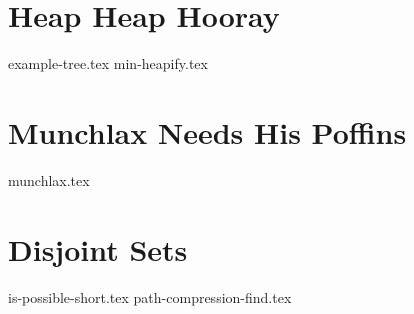 \documentclass[11pt]{exam}
\begin{document}
\section{Heap Heap Hooray}

\begin{questions}
{example-tree.tex}
{min-heapify.tex}
\end{questions}

\clearpage


\section{Munchlax Needs His Poffins}

\begin{questions}
{munchlax.tex}
\end{questions}

\clearpage


\section{Disjoint Sets}

\begin{questions}
{is-possible-short.tex}
{path-compression-find.tex}
\end{questions}
\end{document}
